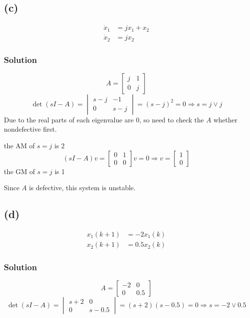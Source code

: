 \documentclass[12pt,a4paper]{article}
\begin{document}
	
	\subsection*{(c)}
	\begin{align*}
		\dot{x}_{1} &= jx_{1}+x_{2} \\
		\dot{x}_{2} &= jx_{2}
	\end{align*}
	
	\subsubsection*{Solution}
	
	\[
	A = \begin{bmatrix}
		 j & 1 \\ 0 & j
	\end{bmatrix}
	\]
	\[
	\det (sI - A) = \begin{vmatrix}
		s - j & -1 \\ 0 & s - j
	\end{vmatrix} = (s -j)^2 = 0 \Rightarrow s = j \lor j
	\]
	Due to the real parts of each eigenvalue are $0$, so need to check the $A$ whether nondefective first.
	
	the AM of $s = j$ is 2 
	\[(sI - A)v = 
	\begin{bmatrix}
		0 & 1 \\ 0 & 0 
	\end{bmatrix}v = 0 \Rightarrow v = \begin{bmatrix}
	1 \\0
	\end{bmatrix}
	\]
	the GM of $s = j$ is 1
	
	Since $A$ is defective, this system is unstable.
	
	\subsection*{(d)}
	\begin{align*}
		x_{1}(k+1) &= -2x_{1}(k) \\
		x_{2}(k+1) &= 0.5x_{2}(k)
	\end{align*}
	
	\subsubsection*{Solution}
	\[
	A = \begin{bmatrix}
		-2 & 0 \\ 0 & 0.5
	\end{bmatrix}
	\]
	\[
	\det (sI - A) = \begin{vmatrix}
		s +2 & 0 \\ 0 & s-0.5
	\end{vmatrix} = (s+2)(s - 0.5) = 0 \Rightarrow s = -2 \lor 0.5
	\]
	
\end{document}
